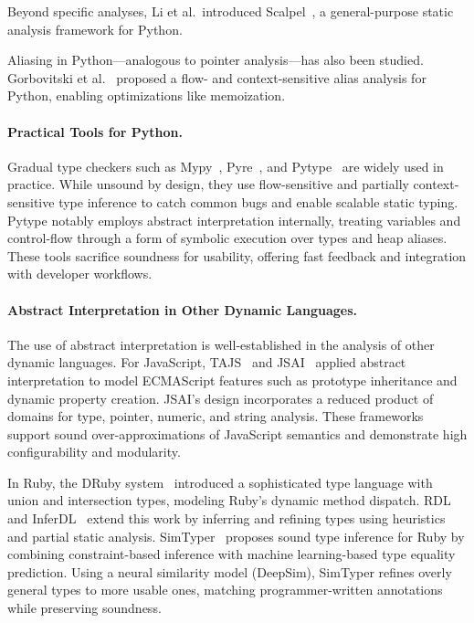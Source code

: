 Beyond specific analyses, Li et al.\ introduced Scalpel~\cite{li2022scalpel}, a general-purpose static analysis framework for Python.

Aliasing in Python---analogous to pointer analysis---has also been studied. Gorbovitski et al.~\cite{gorbovitski2010alias} proposed a flow- and context-sensitive alias analysis for Python, enabling optimizations like memoization.

\paragraph{Practical Tools for Python.}
Gradual type checkers such as Mypy~\cite{mypy}, Pyre~\cite{pyre}, and Pytype~\cite{pytype} are widely used in practice. While unsound by design, they use flow-sensitive and partially context-sensitive type inference to catch common bugs and enable scalable static typing. Pytype notably employs abstract interpretation internally, treating variables and control-flow through a form of symbolic execution over types and heap aliases. These tools sacrifice soundness for usability, offering fast feedback and integration with developer workflows.

\paragraph{Abstract Interpretation in Other Dynamic Languages.}
The use of abstract interpretation is well-established in the analysis of other dynamic languages. For JavaScript, TAJS~\cite{jensen2009type} and JSAI~\cite{kashyap2014jsai} applied abstract interpretation to model ECMAScript features such as prototype inheritance and dynamic property creation. JSAI's design incorporates a reduced product of domains for type, pointer, numeric, and string analysis. These frameworks support sound over-approximations of JavaScript semantics and demonstrate high configurability and modularity.

In Ruby, the DRuby system~\cite{furr2009static} introduced a sophisticated type language with union and intersection types, modeling Ruby's dynamic method dispatch. RDL and InferDL~\cite{kazerounian2020sound} extend this work by inferring and refining types using heuristics and partial static analysis. SimTyper~\cite{kazerounian2021simtyper} proposes sound type inference for Ruby by combining constraint-based inference with machine learning-based type equality prediction. Using a neural similarity model (DeepSim), SimTyper refines overly general types to more usable ones, matching programmer-written annotations while preserving soundness.

